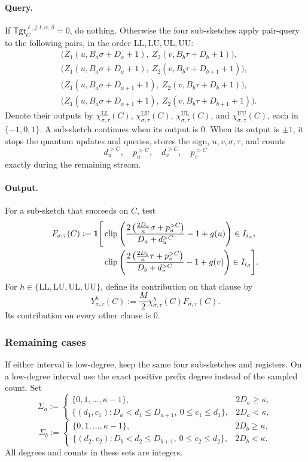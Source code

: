 \paragraph{Query.}
If $\mathsf{Tgt}^{\ell,j,t,\alpha,\beta}_C=0$, do nothing.
Otherwise the four sub-sketches apply pair-query to the following pairs, in the order $\mathrm{LL},\mathrm{LU},\mathrm{UL},\mathrm{UU}$:
\[
\begin{aligned}
  &\bigl(Z_1(u,B_a\sigma+D_a+1),\ Z_2(v,B_b\tau+D_b+1)\bigr),\\
  &\bigl(Z_1(u,B_a\sigma+D_a+1),\ Z_2(v,B_b\tau+D_{b+1}+1)\bigr),\\
  &\bigl(Z_1(u,B_a\sigma+D_{a+1}+1),\ Z_2(v,B_b\tau+D_b+1)\bigr),\\
  &\bigl(Z_1(u,B_a\sigma+D_{a+1}+1),\ Z_2(v,B_b\tau+D_{b+1}+1)\bigr).
\end{aligned}
\]
Denote their outputs by $\chi^{\mathrm{LL}}_{\sigma,\tau}(C)$, $\chi^{\mathrm{LU}}_{\sigma,\tau}(C)$, $\chi^{\mathrm{UL}}_{\sigma,\tau}(C)$, and $\chi^{\mathrm{UU}}_{\sigma,\tau}(C)$, each in $\{-1,0,1\}$.
A sub-sketch continues when its output is $0$.
When its output is $\pm1$, it stops the quantum updates and queries, stores the sign, $u,v,\sigma,\tau$, and counts
\[
  d_u^{>C},\quad p_u^{>C},\quad d_v^{>C},\quad p_v^{>C}
\]
exactly during the remaining stream.

\paragraph{Output.}
For a sub-sketch that succeeds on $C$, test
\[
\begin{aligned}
  F_{\sigma,\tau}(C):=\mathbf 1\Biggl[&
  \operatorname{clip}\left(\frac{2\left(\frac{2D_a}{\kappa}\sigma+p_u^{>C}\right)}{D_a+d_u^{>C}}-1+g(u)\right)\in I_{i_\alpha},\\
  &\operatorname{clip}\left(\frac{2\left(\frac{2D_b}{\kappa}\tau+p_v^{>C}\right)}{D_b+d_v^{>C}}-1+g(v)\right)\in I_{i_\beta}\Biggr].
\end{aligned}
\]
For $h\in\{\mathrm{LL},\mathrm{LU},\mathrm{UL},\mathrm{UU}\}$, define its contribution on that clause by
\[
  Y^h_{\sigma,\tau}(C):=\frac M2\chi^h_{\sigma,\tau}(C)F_{\sigma,\tau}(C).
\]
Its contribution on every other clause is $0$.

\subsubsection{Remaining cases} \label{sec:othercases}
If either interval is low-degree, keep the same four sub-sketches and registers.
On a low-degree interval use the exact positive prefix degree instead of the sampled count.
Set
\[
  \Sigma_a:=\begin{cases}
    \{0,1,\ldots,\kappa-1\},&2D_a\ge\kappa,\\
    \{(d_1,c_1):D_a<d_1\le D_{a+1},\ 0\le c_1\le d_1\},&2D_a<\kappa,
  \end{cases}
\]
\[
  \Sigma_b:=\begin{cases}
    \{0,1,\ldots,\kappa-1\},&2D_b\ge\kappa,\\
    \{(d_2,c_2):D_b<d_2\le D_{b+1},\ 0\le c_2\le d_2\},&2D_b<\kappa.
  \end{cases}
\]
All degrees and counts in these sets are integers.

